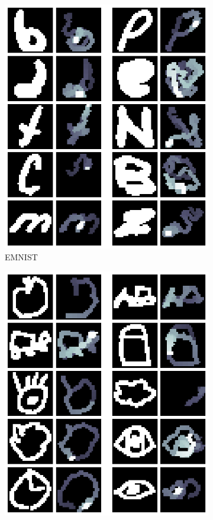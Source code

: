 \begin{figure}[!ht]
\begin{subfigure}[b]{0.3\textwidth}
        \includegraphics[width=\textwidth]{images/resultate/base-mnist-emnist.png}
        \caption{EMNIST}
    \end{subfigure}
    \begin{subfigure}[b]{0.3\textwidth}
        \centering
        \includegraphics[width=\textwidth]{images/resultate/base-mnist-quickdraw.png}

\end{subfigure}
\end{figure}
